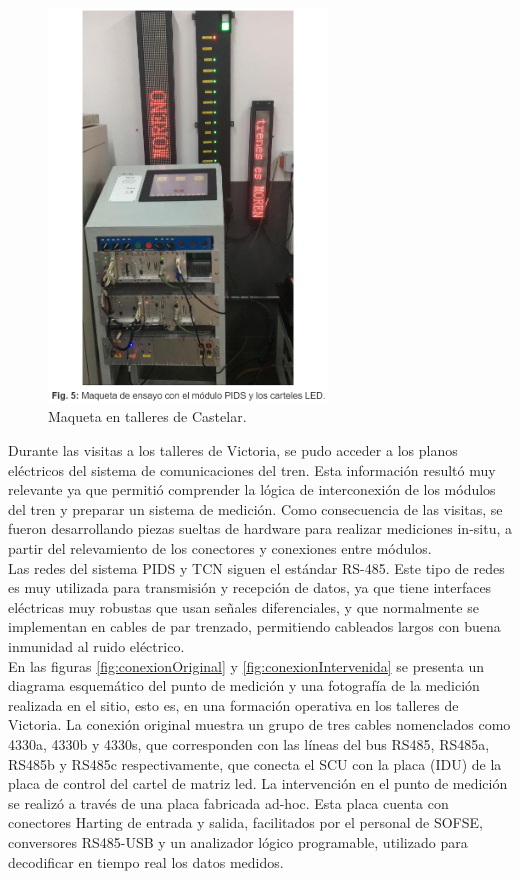 \begin{figure}[H]
	\centering
	\includegraphics[width=0.66\textwidth]{./Figures/maqueta.png}
	\caption{Maqueta en talleres de Castelar.}
	\label{fig:maquetaCastelar}
\end{figure}


Durante las visitas a los talleres de Victoria, se pudo acceder a los planos eléctricos del sistema de comunicaciones del tren. Esta información resultó muy relevante ya que permitió comprender la lógica de interconexión de los módulos del tren y preparar un sistema de medición. Como consecuencia de las visitas, se fueron desarrollando piezas sueltas de hardware para realizar mediciones in-situ, a partir del relevamiento de los conectores y conexiones entre módulos.\\


Las redes del sistema PIDS y TCN siguen el estándar RS-485. Este tipo de redes es muy utilizada para transmisión y recepción de datos, ya que tiene interfaces eléctricas muy robustas que usan señales diferenciales, y que normalmente se implementan en cables de par trenzado, permitiendo cableados largos con buena inmunidad al ruido eléctrico. \\

En las figuras \ref{fig:conexionOriginal} y \ref{fig:conexionIntervenida} se presenta un diagrama esquemático del punto de medición y una fotografía de la medición realizada en el sitio, esto es, en una formación operativa en los talleres de Victoria. La conexión original muestra un grupo de tres cables nomenclados como 4330a, 4330b y 4330s, que corresponden con las líneas del bus RS485, RS485a, RS485b y RS485c respectivamente, que conecta el SCU con la placa (IDU) de la placa de control del cartel de matriz led.  La intervención en el punto de medición se realizó a través de una placa fabricada ad-hoc. Esta placa cuenta con conectores Harting de entrada y salida, facilitados por el personal de SOFSE, conversores RS485-USB y un analizador lógico programable, utilizado para decodificar en tiempo real los datos medidos.\\



